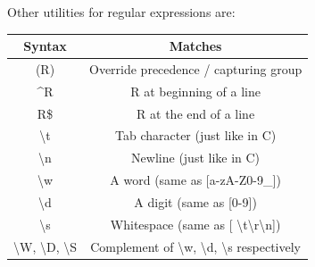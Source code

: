 \documentclass[12pt, a4paper]{report}
\newtheorem[style=M, bodystyle=\normalfont]{operation}{Operation}
\newtheorem[style=M, bodystyle=\normalfont]{theorem}{Theorem}
\newtheorem[style=M, bodystyle=\normalfont]{corollary}{Corollary}
\newtheorem[style=M, bodystyle=\normalfont]{lemma}{Lemma}
\newtheorem[style=M, bodystyle=\normalfont]{definition}{Definition}
\begin{document}
    Other utilities for regular expressions are: 
    \begin{table}[H]
        \centering
        \begin{tabular}{cc}
        \hline
        \textbf{Syntax}                                         & \textbf{Matches}                                                                   \\ \hline
        (R)                                                     & Override precedence / capturing group                                              \\
        \textasciicircum{}R                                     & R at beginning of a line                                                           \\
        R\$                                                     & R at the end of a line                                                             \\
        \textbackslash{}t                                       & Tab character (just like in C)                                                     \\
        \textbackslash{}n                                       & Newline (just like in C)                                                           \\
        \textbackslash{}w                                       & A word (same as {[}a-zA-Z0-9\_{]})                                                 \\
        \textbackslash{}d                                       & A digit (same as {[}0-9{]})                                                        \\
        \textbackslash{}s                                       & Whitespace (same as {[} \textbackslash{}t\textbackslash{}r\textbackslash{}n{]})    \\
        \textbackslash{}W, \textbackslash{}D, \textbackslash{}S & Complement of \textbackslash{}w, \textbackslash{}d, \textbackslash{}s respectively \\ \hline
        \end{tabular}
    \end{table}
\end{document}
